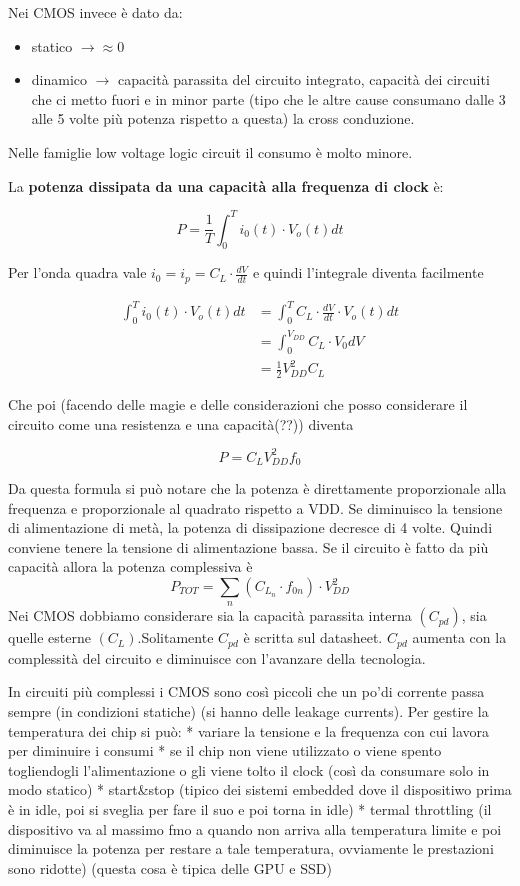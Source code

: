 \documentclass[
]{article}
\providecommand{\tightlist}{%
  \setlength{\itemsep}{0pt}\setlength{\parskip}{0pt}}
\begin{document}
Nei CMOS invece è dato da:

\begin{itemize}
\tightlist
\item
  statico \(\rightarrow\approx 0\)
\item
  dinamico \(\rightarrow\) capacità parassita del circuito integrato,
  capacità dei circuiti che ci metto fuori e in minor parte (tipo che le
  altre cause consumano dalle 3 alle 5 volte più potenza rispetto a
  questa) la cross conduzione.
\end{itemize}

Nelle famiglie low voltage logic circuit il consumo è molto minore.

La \textbf{potenza dissipata da una capacità alla frequenza di clock} è:

\[P=\frac{1}{T}\int_{0}^{T}i_{0}(t)\cdot V_{o}(t)dt\]

Per l'onda quadra vale \(i_{0}=i_{p}=C_{L}\cdot\frac{dV}{dt}\) e quindi
l'integrale diventa facilmente

\begin{align*}
\int_{0}^{T}i_{0}(t)\cdot V_{o}(t)dt &=\int_{0}^{T}C_{L}\cdot\frac{dV}{dt}\cdot V_{o}(t)dt\\
&=\int_{0}^{V_{DD}}C_{L}\cdot V_{0}dV\\
&=\frac{1}{2}V_{DD}^{2}C_{L}
\end{align*}

Che poi (facendo delle magie e delle considerazioni che posso
considerare il circuito come una resistenza e una capacità(??)) diventa

\[P=C_{L}V_{DD}^{2}f_{0}\]

Da questa formula si può notare che la potenza è direttamente
proporzionale alla frequenza e proporzionale al quadrato rispetto a VDD.
Se diminuisco la tensione di alimentazione di metà, la potenza di
dissipazione decresce di 4 volte. Quindi conviene tenere la tensione di
alimentazione bassa. Se il circuito è fatto da più capacità allora la
potenza complessiva è \[
P_{TOT}=\sum_{n}(C_{L_{n}}\cdot f_{0n})\cdot V_{DD}^{2}
\] Nei CMOS dobbiamo considerare sia la capacità parassita interna
\((C_{pd})\), sia quelle esterne \((C_{L})\).Solitamente \(C_{pd}\) è
scritta sul datasheet. \(C_{pd}\) aumenta con la complessità del
circuito e diminuisce con l'avanzare della tecnologia.

In circuiti più complessi i CMOS sono così piccoli che un po'di corrente
passa sempre (in condizioni statiche) (si hanno delle leakage currents).
Per gestire la temperatura dei chip si può: * variare la tensione e la
frequenza con cui lavora per diminuire i consumi * se il chip non viene
utilizzato o viene spento togliendogli l'alimentazione o gli viene tolto
il clock (così da consumare solo in modo statico) * start\&stop (tipico
dei sistemi embedded dove il dispositiwo prima è in idle, poi si sveglia
per fare il suo e poi torna in idle) * termal throttling (il dispositivo
va al massimo fmo a quando non arriva alla temperatura limite e poi
diminuisce la potenza per restare a tale temperatura, ovviamente le
prestazioni sono ridotte) (questa cosa è tipica delle GPU e SSD)
\end{document}

